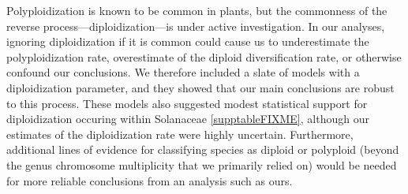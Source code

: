 Polyploidization is known to be common in plants, but the commonness of the reverse process---diploidization---is under active investigation.
%
In our analyses, ignoring diploidization if it is common could cause us to underestimate the polyploidization rate, overestimate of the diploid diversification rate, or otherwise confound our conclusions.
We therefore included a slate of models with a diploidization parameter, and they showed that our main conclusions are robust to this process.
These models also suggested modest statistical support for diploidization occuring within Solanaceae \cref{supptableFIXME}, although our estimates of the diploidization rate were highly uncertain.
Furthermore, additional lines of evidence for classifying species as diploid or polyploid (beyond the genus chromosome multiplicity that we primarily relied on) would be needed for more reliable conclusions from an analysis such as ours.


